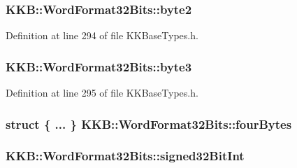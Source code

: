 \subsubsection[{\texorpdfstring{byte2}{byte2}}]{ K\+K\+B\+::\+Word\+Format32\+Bits\+::byte2}\hypertarget{union_k_k_b_1_1_word_format32_bits_a7dce1e987826e201b31d75d3050359ba}{}\label{union_k_k_b_1_1_word_format32_bits_a7dce1e987826e201b31d75d3050359ba}


Definition at line 294 of file K\+K\+Base\+Types.\+h.

\subsubsection[{\texorpdfstring{byte3}{byte3}}]{ K\+K\+B\+::\+Word\+Format32\+Bits\+::byte3}\hypertarget{union_k_k_b_1_1_word_format32_bits_aa833400f553206f88aae886076886fe8}{}\label{union_k_k_b_1_1_word_format32_bits_aa833400f553206f88aae886076886fe8}


Definition at line 295 of file K\+K\+Base\+Types.\+h.

\subsubsection[{\texorpdfstring{four\+Bytes}{fourBytes}}]{\setlength{\rightskip}{0pt plus 5cm}struct \{ ... \}    K\+K\+B\+::\+Word\+Format32\+Bits\+::four\+Bytes}\hypertarget{union_k_k_b_1_1_word_format32_bits_a377fc22bfc20aaa559f6572b55663069}{}\label{union_k_k_b_1_1_word_format32_bits_a377fc22bfc20aaa559f6572b55663069}
\subsubsection[{\texorpdfstring{signed32\+Bit\+Int}{signed32BitInt}}]{ K\+K\+B\+::\+Word\+Format32\+Bits\+::signed32\+Bit\+Int}\hypertarget{union_k_k_b_1_1_word_format32_bits_a0f0a2e9b5926c499ded704deff7297b5}{}\label{union_k_k_b_1_1_word_format32_bits_a0f0a2e9b5926c499ded704deff7297b5}


